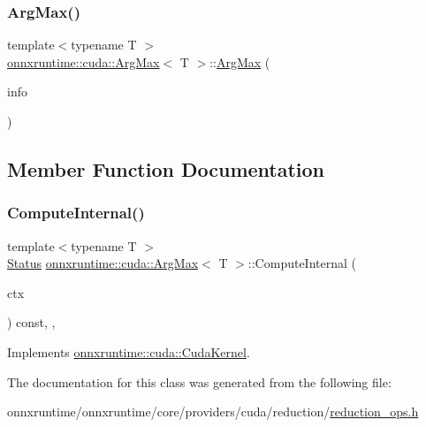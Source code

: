\subsubsection{\texorpdfstring{Arg\+Max()}{ArgMax()}}
{\footnotesize\ttfamily template$<$typename T $>$ \\
\mbox{\hyperlink{classonnxruntime_1_1cuda_1_1ArgMax}{onnxruntime\+::cuda\+::\+Arg\+Max}}$<$ T $>$\+::\mbox{\hyperlink{classonnxruntime_1_1cuda_1_1ArgMax}{Arg\+Max}} (\begin{DoxyParamCaption}\item[{const \mbox{\hyperlink{classonnxruntime_1_1OpKernelInfo}{Op\+Kernel\+Info}} \&}]{info }\end{DoxyParamCaption})\hspace{0.3cm}{\ttfamily [inline]}}



\subsection{Member Function Documentation}
\mbox{\label{classonnxruntime_1_1cuda_1_1ArgMax_a0c5c20fc8c137945fa12b53005374c87}} 
\subsubsection{\texorpdfstring{Compute\+Internal()}{ComputeInternal()}}
{\footnotesize\ttfamily template$<$typename T $>$ \\
\mbox{\hyperlink{classonnxruntime_1_1common_1_1Status}{Status}} \mbox{\hyperlink{classonnxruntime_1_1cuda_1_1ArgMax}{onnxruntime\+::cuda\+::\+Arg\+Max}}$<$ T $>$\+::Compute\+Internal (\begin{DoxyParamCaption}\item[{\mbox{\hyperlink{classonnxruntime_1_1OpKernelContext}{Op\+Kernel\+Context}} $\ast$}]{ctx }\end{DoxyParamCaption}) const\hspace{0.3cm}{\ttfamily [inline]}, {\ttfamily [override]}, {\ttfamily [virtual]}}



Implements \mbox{\hyperlink{classonnxruntime_1_1cuda_1_1CudaKernel_aca7af04ae448017d6023d30bba231ebb}{onnxruntime\+::cuda\+::\+Cuda\+Kernel}}.



The documentation for this class was generated from the following file\+:\begin{DoxyCompactItemize}
\item 
onnxruntime/onnxruntime/core/providers/cuda/reduction/\mbox{\hyperlink{cuda_2reduction_2reduction__ops_8h}{reduction\+\_\+ops.\+h}}\end{DoxyCompactItemize}
